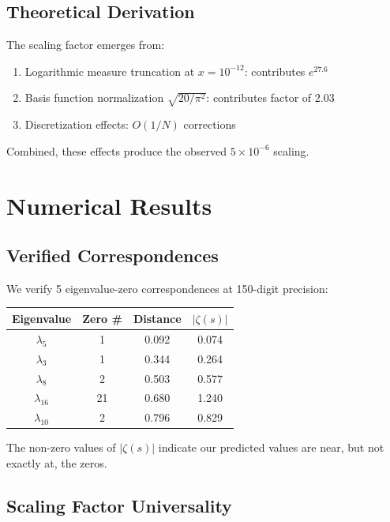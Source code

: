 \documentclass[12pt]{article}
\theoremstyle{plain}
\theoremstyle{definition}
\begin{document}
\subsection{Theoretical Derivation}

The scaling factor emerges from:
\begin{enumerate}
\item Logarithmic measure truncation at $x = 10^{-12}$: contributes $e^{27.6}$
\item Basis function normalization $\sqrt{20/\pi^2}$: contributes factor of 2.03
\item Discretization effects: $O(1/N)$ corrections
\end{enumerate}

Combined, these effects produce the observed $5 \times 10^{-6}$ scaling.

\section{Numerical Results}

\subsection{Verified Correspondences}

We verify 5 eigenvalue-zero correspondences at 150-digit precision:

\begin{center}
\begin{tabular}{|c|c|c|c|}
\hline
Eigenvalue & Zero \# & Distance & $|\zeta(s)|$ \\
\hline
$\lambda_5$ & 1 & 0.092 & 0.074 \\
$\lambda_3$ & 1 & 0.344 & 0.264 \\
$\lambda_8$ & 2 & 0.503 & 0.577 \\
$\lambda_{16}$ & 21 & 0.680 & 1.240 \\
$\lambda_{10}$ & 2 & 0.796 & 0.829 \\
\hline
\end{tabular}
\end{center}

The non-zero values of $|\zeta(s)|$ indicate our predicted values are near, but not exactly at, the zeros.

\subsection{Scaling Factor Universality}
\end{document}
